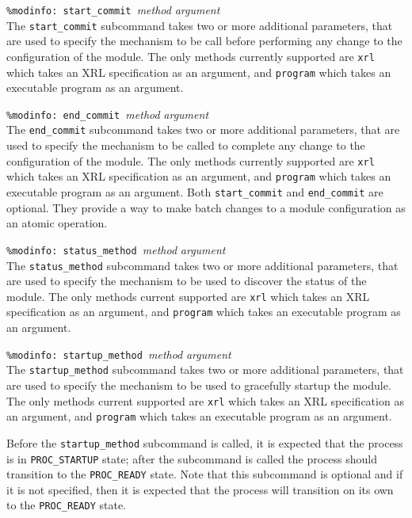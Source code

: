 \documentclass[11pt]{article}
\begin{document}
\begin{description}
\item {{\tt \%modinfo: start\_commit }{\it method }{\it argument}}  \\
The {\tt start\_commit} subcommand takes two or more additional parameters,
that
are used to specify the mechanism to be call before performing any change to
the configuration of the module. The only methods currently supported are
{\tt xrl} which takes an XRL specification as an argument, and
{\tt program} which takes an executable program as an argument.

\item {{\tt \%modinfo: end\_commit }{\it method }{\it argument}}  \\
The {\tt end\_commit} subcommand takes two or more additional parameters, that
are used to specify the mechanism to be called to complete any change to the
configuration of the module. The only methods currently supported are {\tt xrl}
which takes an XRL specification as an argument, and {\tt program}
which takes an executable program as an argument.
Both {\tt start\_commit} and {\tt end\_commit} are optional. They provide a way
to make batch changes to a module configuration as an atomic operation.

\item {{\tt \%modinfo: status\_method }{\it method }{\it argument}}  \\
The {\tt status\_method} subcommand takes two or more additional parameters,
that are used to specify the mechanism to be used to discover the status of
the module.
The only methods current supported are {\tt xrl} which takes an XRL
specification as an argument, and {\tt program} which takes an executable
program as an argument.

\item {{\tt \%modinfo: startup\_method }{\it method }{\it argument}}  \\
The {\tt startup\_method} subcommand takes two or more additional parameters,
that are used to specify the mechanism to be used to gracefully startup the
module. The only methods current supported are {\tt xrl} which takes an XRL
specification as an argument, and {\tt program} which takes an executable
program as an argument.

Before the {\tt startup\_method} subcommand is called, it is expected
that the process is in {\tt PROC\_STARTUP} state; after the subcommand
is called the process should transition to the {\tt PROC\_READY} state.
Note that this subcommand is optional and if it is not specified, then
it is expected that the process will transition on its own to the
{\tt PROC\_READY} state.


\end{description}
\end{document}
